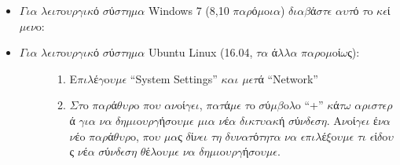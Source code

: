 \documentclass[a4paper,11pt,english]{sphinxmanual}
\begin{document}
\begin{itemize}
\item {} 
\(\Gamma\)\(\iota\)\(\alpha\) \(\lambda\)\(\epsilon\)\(\iota\)\(\tau\)o\(\upsilon\)\(\rho\)\(\gamma\)\(\iota\)\(\kappa\)ό \(\sigma\)ύ\(\sigma\)\(\tau\)\(\eta\)\(\mu\)\(\alpha\) Windows 7 (8,10 \(\pi\)\(\alpha\)\(\rho\)ό\(\mu\)o\(\iota\)\(\alpha\)) \(\delta\)\(\iota\)\(\alpha\)\(\beta\)ά\(\sigma\)\(\tau\)\(\epsilon\) \(\alpha\)\(\upsilon\)\(\tau\)ό \(\tau\)o \(\kappa\)\(\epsilon\)ί\(\mu\)\(\epsilon\)\(\nu\)o: 

\item {} \begin{description}
\item[{\(\Gamma\)\(\iota\)\(\alpha\) \(\lambda\)\(\epsilon\)\(\iota\)\(\tau\)o\(\upsilon\)\(\rho\)\(\gamma\)\(\iota\)\(\kappa\)ό \(\sigma\)ύ\(\sigma\)\(\tau\)\(\eta\)\(\mu\)\(\alpha\) Ubuntu Linux (16.04, \(\tau\)\(\alpha\) ά\(\lambda\)\(\lambda\)\(\alpha\) \(\pi\)\(\alpha\)\(\rho\)o\(\mu\)oί\(\omega\)ς):}] \leavevmode\begin{enumerate}
\item {} 
E\(\pi\)\(\iota\)\(\lambda\)έ\(\gamma\)o\(\upsilon\)\(\mu\)\(\epsilon\) “System Settings” \(\kappa\)\(\alpha\)\(\iota\) \(\mu\)\(\epsilon\)\(\tau\)ά “Network”

\item {} 
\(\Sigma\)\(\tau\)o \(\pi\)\(\alpha\)\(\rho\)ά\(\theta\)\(\upsilon\)\(\rho\)o \(\pi\)o\(\upsilon\) \(\alpha\)\(\nu\)oί\(\gamma\)\(\epsilon\)\(\iota\), \(\pi\)\(\alpha\)\(\tau\)ά\(\mu\)\(\epsilon\) \(\tau\)o \(\sigma\)ύ\(\mu\)\(\beta\)o\(\lambda\)o “+” \(\kappa\)ά\(\tau\)\(\omega\) \(\alpha\)\(\rho\)\(\iota\)\(\sigma\)\(\tau\)\(\epsilon\)\(\rho\)ά \(\gamma\)\(\iota\)\(\alpha\) \(\nu\)\(\alpha\) \(\delta\)\(\eta\)\(\mu\)\(\iota\)o\(\upsilon\)\(\rho\)\(\gamma\)ή\(\sigma\)o\(\upsilon\)\(\mu\)\(\epsilon\) \(\mu\)\(\iota\)\(\alpha\) \(\nu\)έ\(\alpha\) \(\delta\)\(\iota\)\(\kappa\)\(\tau\)\(\upsilon\)\(\alpha\)\(\kappa\)ή \(\sigma\)ύ\(\nu\)\(\delta\)\(\epsilon\)\(\sigma\)\(\eta\). A\(\nu\)oί\(\gamma\)\(\epsilon\)\(\iota\) έ\(\nu\)\(\alpha\) \(\nu\)έo \(\pi\)\(\alpha\)\(\rho\)ά\(\theta\)\(\upsilon\)\(\rho\)o, \(\pi\)o\(\upsilon\) \(\mu\)\(\alpha\)ς \(\delta\)ί\(\nu\)\(\epsilon\)\(\iota\) \(\tau\)\(\eta\) \(\delta\)\(\upsilon\)\(\nu\)\(\alpha\)\(\tau\)ό\(\tau\)\(\eta\)\(\tau\)\(\alpha\) \(\nu\)\(\alpha\) \(\epsilon\)\(\pi\)\(\iota\)\(\lambda\)έ\(\xi\)o\(\upsilon\)\(\mu\)\(\epsilon\) \(\tau\)\(\iota\) \(\epsilon\)ί\(\delta\)o\(\upsilon\)ς \(\nu\)έ\(\alpha\) \(\sigma\)ύ\(\nu\)\(\delta\)\(\epsilon\)\(\sigma\)\(\eta\) \(\theta\)έ\(\lambda\)o\(\upsilon\)\(\mu\)\(\epsilon\) \(\nu\)\(\alpha\) \(\delta\)\(\eta\)\(\mu\)\(\iota\)o\(\upsilon\)\(\rho\)\(\gamma\)ή\(\sigma\)o\(\upsilon\)\(\mu\)\(\epsilon\).


\end{enumerate}
\end{description}
\end{itemize}
\end{document}
